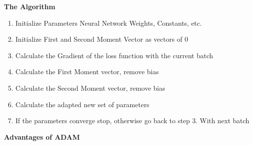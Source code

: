 \documentclass{beamer}
\newcommand\myheading[1]{%
  \par\bigskip
  {\Large\bfseries#1}\par\smallskip}
\begin{document}
\begin{frame}
    \myheading{The Algorithm}
    \begin{enumerate}
        \item Initialize Parameters
        Neural Network Weights, Constants, etc.
        \item Initialize First and Second Moment Vector as vectors of 0
        \item Calculate the Gradient of the loss function with the current batch
        \item Calculate the First Moment vector, remove bias
        \item Calculate the Second Moment vector, remove bias
        \item Calculate the adapted new set of parameters
        \item If the parameters converge stop, otherwise go back to step 3. With next batch
    \end{enumerate}
\end{frame}




\begin{frame}
    \myheading{Advantages of ADAM}
\end{frame}
\end{document}
